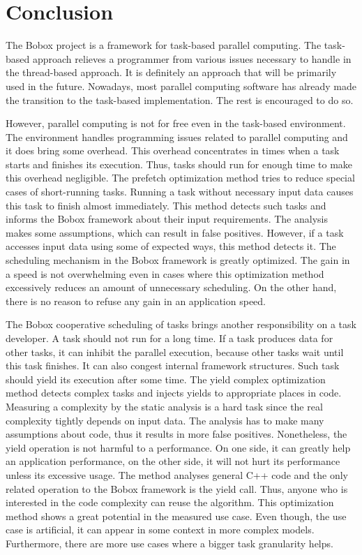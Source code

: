 \chapter{Conclusion}
The Bobox project is a framework for task-based parallel computing. The task-based approach relieves a programmer from various issues necessary to handle in the thread-based approach. It is definitely an approach that will be primarily used in the future. Nowadays, most parallel computing software has already made the transition to the task-based implementation. The rest is encouraged to do so.

However, parallel computing is not for free even in the task-based environment. The environment handles programming issues related to parallel computing and it does bring some overhead. This overhead concentrates in times when a task starts and finishes its execution. Thus, tasks should run for enough time to make this overhead negligible. The prefetch optimization method tries to  reduce special cases of short-running tasks. Running a task without necessary input data causes this task to finish almost immediately. This method detects such tasks and informs the Bobox framework about their input requirements. The analysis makes some assumptions, which can result in false positives. However, if a task accesses input data using some of expected ways, this method detects it. The scheduling mechanism in the Bobox framework is greatly optimized. The gain in a speed is not overwhelming even in cases where this optimization method excessively reduces an amount of unnecessary scheduling. On the other hand, there is no reason to refuse any gain in an application speed.

The Bobox cooperative scheduling of tasks brings another responsibility on a task developer. A task should not run for a long time. If a task produces data for other tasks, it can inhibit the parallel execution, because other tasks wait until this task finishes. It can also congest internal framework structures. Such task should yield its execution after some time. The yield complex optimization method detects complex tasks and injects yields to appropriate places in code. Measuring a complexity by the static analysis is a hard task since the real complexity tightly depends on input data. The analysis has to make many assumptions about code, thus it results in more false positives. Nonetheless, the yield operation is not harmful to a performance. On one side, it can greatly help an application performance, on the other side, it will not hurt its performance unless its excessive usage. The method analyses general C++ code and the only related operation to the Bobox framework is the yield call. Thus, anyone who is interested in the code complexity can reuse the algorithm. This optimization method shows a great potential in the measured use case. Even though, the use case is artificial, it can appear in some context in more complex models. Furthermore, there are more use cases where a bigger task granularity helps.

